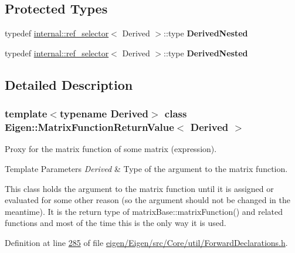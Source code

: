 \subsection*{Protected Types}
\begin{DoxyCompactItemize}
\item 
\mbox{\label{class_eigen_1_1_matrix_function_return_value_a0bac4087b2a06c0bab8e8f025b3d4097}} 
typedef \hyperlink{struct_eigen_1_1internal_1_1ref__selector}{internal\+::ref\+\_\+selector}$<$ Derived $>$\+::type {\bfseries Derived\+Nested}
\item 
\mbox{\label{class_eigen_1_1_matrix_function_return_value_a0bac4087b2a06c0bab8e8f025b3d4097}} 
typedef \hyperlink{struct_eigen_1_1internal_1_1ref__selector}{internal\+::ref\+\_\+selector}$<$ Derived $>$\+::type {\bfseries Derived\+Nested}
\end{DoxyCompactItemize}


\subsection{Detailed Description}
\subsubsection*{template$<$typename Derived$>$\newline
class Eigen\+::\+Matrix\+Function\+Return\+Value$<$ Derived $>$}

Proxy for the matrix function of some matrix (expression). 


\begin{DoxyTemplParams}{Template Parameters}
{\em Derived} & Type of the argument to the matrix function.\\
\hline
\end{DoxyTemplParams}
This class holds the argument to the matrix function until it is assigned or evaluated for some other reason (so the argument should not be changed in the meantime). It is the return type of matrix\+Base\+::matrix\+Function() and related functions and most of the time this is the only way it is used. 

Definition at line \hyperlink{eigen_2_eigen_2src_2_core_2util_2_forward_declarations_8h_source_l00285}{285} of file \hyperlink{eigen_2_eigen_2src_2_core_2util_2_forward_declarations_8h_source}{eigen/\+Eigen/src/\+Core/util/\+Forward\+Declarations.\+h}.



